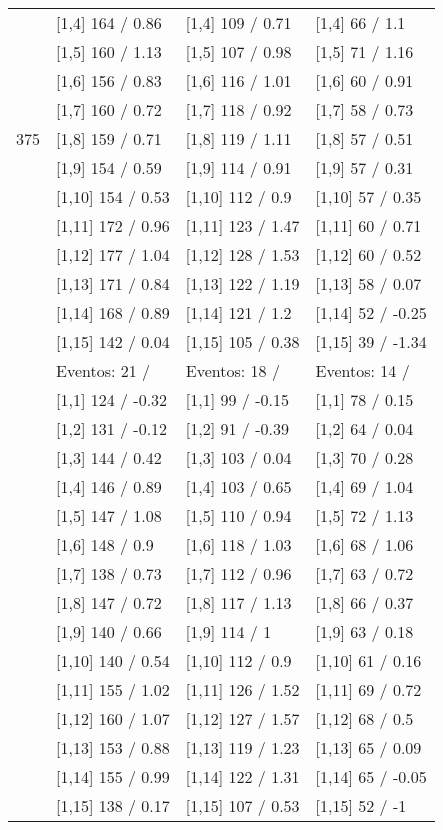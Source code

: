 \begin{table}
\begin{tabular}[t]{llll}
\addlinespace
 & {}[1,4] 164  / 0.86 & {}[1,4] 109  / 0.71 & {}[1,4] 66  / 1.1\\
 & {}[1,5] 160  / 1.13 & {}[1,5] 107  / 0.98 & {}[1,5] 71  / 1.16\\
 & {}[1,6] 156  / 0.83 & {}[1,6] 116  / 1.01 & {}[1,6] 60  / 0.91\\
 & {}[1,7] 160  / 0.72 & {}[1,7] 118  / 0.92 & {}[1,7] 58  / 0.73\\
375 & {}[1,8] 159  / 0.71 & {}[1,8] 119  / 1.11 & {}[1,8] 57  / 0.51\\
\addlinespace
 & {}[1,9] 154  / 0.59 & {}[1,9] 114  / 0.91 & {}[1,9] 57  / 0.31\\
 & {}[1,10] 154  / 0.53 & {}[1,10] 112  / 0.9 & {}[1,10] 57  / 0.35\\
 & {}[1,11] 172  / 0.96 & {}[1,11] 123  / 1.47 & {}[1,11] 60  / 0.71\\
 & {}[1,12] 177  / 1.04 & {}[1,12] 128  / 1.53 & {}[1,12] 60  / 0.52\\
 & {}[1,13] 171  / 0.84 & {}[1,13] 122  / 1.19 & {}[1,13] 58  / 0.07\\
\addlinespace
 & {}[1,14] 168  / 0.89 & {}[1,14] 121  / 1.2 & {}[1,14] 52  / -0.25\\
 & {}[1,15] 142  / 0.04 & {}[1,15] 105  / 0.38 & {}[1,15] 39  / -1.34\\
 & Eventos:  21 / & Eventos:  18 / & Eventos:  14 /\\
 & {}[1,1] 124  / -0.32 & {}[1,1] 99  / -0.15 & {}[1,1] 78  / 0.15\\
 & {}[1,2] 131  / -0.12 & {}[1,2] 91  / -0.39 & {}[1,2] 64  / 0.04\\
\addlinespace
 & {}[1,3] 144  / 0.42 & {}[1,3] 103  / 0.04 & {}[1,3] 70  / 0.28\\
 & {}[1,4] 146  / 0.89 & {}[1,4] 103  / 0.65 & {}[1,4] 69  / 1.04\\
 & {}[1,5] 147  / 1.08 & {}[1,5] 110  / 0.94 & {}[1,5] 72  / 1.13\\
 & {}[1,6] 148  / 0.9 & {}[1,6] 118  / 1.03 & {}[1,6] 68  / 1.06\\
 & {}[1,7] 138  / 0.73 & {}[1,7] 112  / 0.96 & {}[1,7] 63  / 0.72\\
\addlinespace
500 & {}[1,8] 147  / 0.72 & {}[1,8] 117  / 1.13 & {}[1,8] 66  / 0.37\\
 & {}[1,9] 140  / 0.66 & {}[1,9] 114  / 1 & {}[1,9] 63  / 0.18\\
 & {}[1,10] 140  / 0.54 & {}[1,10] 112  / 0.9 & {}[1,10] 61  / 0.16\\
 & {}[1,11] 155  / 1.02 & {}[1,11] 126  / 1.52 & {}[1,11] 69  / 0.72\\
 & {}[1,12] 160  / 1.07 & {}[1,12] 127  / 1.57 & {}[1,12] 68  / 0.5\\
\addlinespace
 & {}[1,13] 153  / 0.88 & {}[1,13] 119  / 1.23 & {}[1,13] 65  / 0.09\\
 & {}[1,14] 155  / 0.99 & {}[1,14] 122  / 1.31 & {}[1,14] 65  / -0.05\\
 & {}[1,15] 138  / 0.17 & {}[1,15] 107  / 0.53 & {}[1,15] 52  / -1\\
\bottomrule
\end{tabular}
\end{table}
